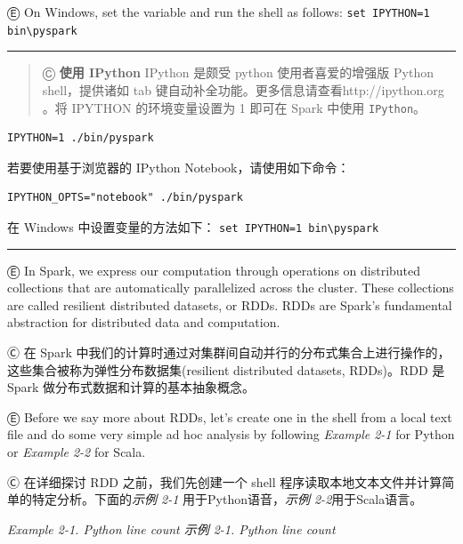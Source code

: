 Ⓔ \textcolor{etc}{On Windows, set the variable and run the shell as follows:}
\lstinline{set IPYTHON=1 bin\pyspark}

\begin{center}\rule{0.5\linewidth}{\linethickness}\end{center}

\begin{quote}
Ⓒ \textbf{使用 IPython} IPython 是颇受 python 使用者喜爱的增强版 Python
shell，提供诸如 tab 键自动补全功能。更多信息请查看http://ipython.org
。将 IPYTHON 的环境变量设置为 1 即可在 Spark 中使用 \lstinline{IPython}。
\end{quote}

\begin{lstlisting}
IPYTHON=1 ./bin/pyspark
\end{lstlisting}

若要使用基于浏览器的 IPython Notebook，请使用如下命令：

\begin{lstlisting}
IPYTHON_OPTS="notebook" ./bin/pyspark
\end{lstlisting}

在 Windows 中设置变量的方法如下：
\lstinline{set IPYTHON=1 bin\pyspark}

\begin{center}\rule{0.5\linewidth}{\linethickness}\end{center}

Ⓔ \textcolor{etc}{In Spark, we express our computation through operations on distributed collections that are automatically parallelized across the cluster. These collections are called resilient distributed datasets, or RDDs. RDDs are Spark's fundamental abstraction for distributed data and computation.}

Ⓒ 在 Spark 中我们的计算时通过对集群间自动并行的分布式集合上进行操作的，这些集合被称为弹性分布数据集(resilient distributed datasets, RDDs)。RDD 是 Spark 做分布式数据和计算的基本抽象概念。

Ⓔ \textcolor{etc}{Before we say more about RDDs, let's create one in the shell from a local text file and do some very simple ad hoc analysis by following \emph{Example 2-1} for Python or \emph{Example 2-2} for Scala.}

Ⓒ 在详细探讨 RDD 之前，我们先创建一个 shell
程序读取本地文本文件并计算简单的特定分析。下面的\emph{示例 2-1}
用于Python语音，\emph{示例 2-2}用于Scala语言。

\emph{Example 2-1. Python line count \textbar{} 示例 2-1. Python line
count} \label{exmp2-1}

